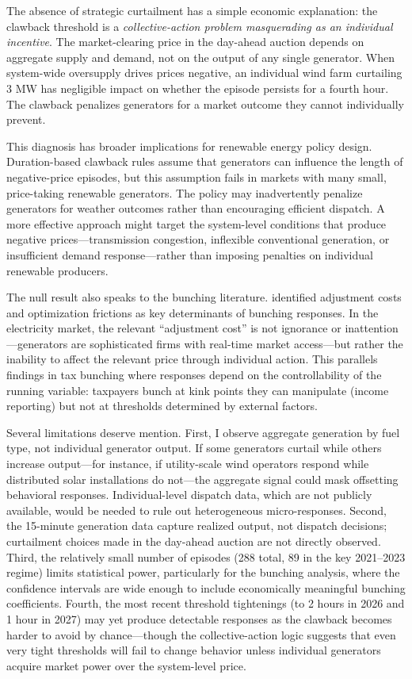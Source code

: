 \documentclass[12pt]{article}
\begin{document}
The absence of strategic curtailment has a simple economic explanation: the clawback threshold is a \emph{collective-action problem masquerading as an individual incentive}. The market-clearing price in the day-ahead auction depends on aggregate supply and demand, not on the output of any single generator. When system-wide oversupply drives prices negative, an individual wind farm curtailing 3 MW has negligible impact on whether the episode persists for a fourth hour. The clawback penalizes generators for a market outcome they cannot individually prevent.

This diagnosis has broader implications for renewable energy policy design. Duration-based clawback rules assume that generators can influence the length of negative-price episodes, but this assumption fails in markets with many small, price-taking renewable generators. The policy may inadvertently penalize generators for weather outcomes rather than encouraging efficient dispatch. A more effective approach might target the system-level conditions that produce negative prices---transmission congestion, inflexible conventional generation, or insufficient demand response---rather than imposing penalties on individual renewable producers.

The null result also speaks to the bunching literature. \citet{ChettyFriedman2011} identified adjustment costs and optimization frictions as key determinants of bunching responses. In the electricity market, the relevant ``adjustment cost'' is not ignorance or inattention---generators are sophisticated firms with real-time market access---but rather the inability to affect the relevant price through individual action. This parallels findings in tax bunching where responses depend on the controllability of the running variable: taxpayers bunch at kink points they can manipulate (income reporting) but not at thresholds determined by external factors.

Several limitations deserve mention. First, I observe aggregate generation by fuel type, not individual generator output. If some generators curtail while others increase output---for instance, if utility-scale wind operators respond while distributed solar installations do not---the aggregate signal could mask offsetting behavioral responses. Individual-level dispatch data, which are not publicly available, would be needed to rule out heterogeneous micro-responses. Second, the 15-minute generation data capture realized output, not dispatch decisions; curtailment choices made in the day-ahead auction are not directly observed. Third, the relatively small number of episodes (288 total, 89 in the key 2021--2023 regime) limits statistical power, particularly for the bunching analysis, where the confidence intervals are wide enough to include economically meaningful bunching coefficients. Fourth, the most recent threshold tightenings (to 2 hours in 2026 and 1 hour in 2027) may yet produce detectable responses as the clawback becomes harder to avoid by chance---though the collective-action logic suggests that even very tight thresholds will fail to change behavior unless individual generators acquire market power over the system-level price.
\end{document}
